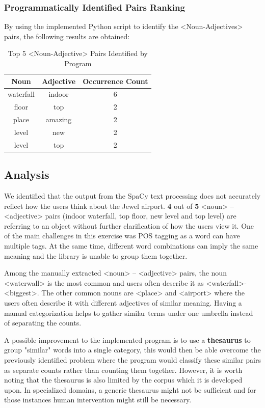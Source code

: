 \documentclass[sigconf,nonacm=true]{acmart}
\begin{document}
\subsubsection{Programmatically Identified Pairs Ranking}
By using the implemented Python script to identify the <Noun-Adjectives> pairs, the following results are obtained:
\begin{table}[H]
	\label{tab:progpairs}
	\begin{tabular}{ccc}
		\toprule
		Noun&Adjective&Occurrence Count\\
		\midrule
		waterfall & indoor & 6 \\
		floor & top & 2 \\
		place & amazing & 2 \\
		level & new & 2 \\
		level & top & 2 \\
		\bottomrule
	\end{tabular}
	\caption{Top 5 <Noun-Adjective> Pairs Identified by Program}
\end{table}

\subsection{Analysis}
We identified that the output from the SpaCy text processing does not accurately reflect how the users think about the Jewel airport. \textbf{4} out of \textbf{5} <noun> – <adjective> pairs  (indoor waterfall, top floor, new level and top level) are referring to an object without further clarification of how the users view it.  One of the main challenges in this exercise was POS tagging as a word can have multiple tags. At the same time, different word combinations can imply the same meaning and the library is unable to group them together.

Among the manually extracted <noun> – <adjective> pairs, the noun <waterwall> is the most common and users often describe it as <waterfall>- <biggest>. The other common nouns are <place> and <airport> where the users often describe it with different adjectives of similar meaning. Having a manual categorization helps to gather similar terms under one umbrella instead of separating the counts.

A possible improvement to the implemented program is to use a \textbf{thesaurus} to group "similar" words into a single category, this would then be able overcome the previously identified problem where the program would classify these similar pairs as separate counts rather than counting them together. However, it is worth noting that the thesaurus is also limited by the corpus which it is developed upon. In specialized domains, a generic thesaurus might not be sufficient and for those instances human intervention might still be necessary.
\end{document}
